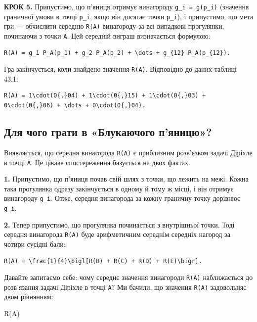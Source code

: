 \documentclass[
  ukrainian,
]{article}
\begin{document}
\textbf{КРОК 5.} Припустимо, що п'яниця отримує винагороду
\texttt{g\_i\ =\ g(p\_i)} (значення граничної умови в точці
\texttt{p\_i}, якщо він досягає точки \texttt{p\_i}), і припустимо, що
мета гри --- обчислити середню \texttt{R(A)} винагороду за всі випадкові
прогулянки, починаючи з точки \texttt{A}. Цей середній виграш
визначається формулою:

\begin{verbatim}
R(A) = g_1 P_A(p_1) + g_2 P_A(p_2) + \dots + g_{12} P_A(p_{12}).
\end{verbatim}

Гра закінчується, коли знайдено значення \texttt{R(A)}. Відповідно до
даних таблиці 43.1:

\begin{verbatim}
R(A) = 1\cdot(0{,}04) + 1\cdot(0{,}15) + 1\cdot(0{,}03) + 0\cdot(0{,}06) + \dots + 0\cdot(0{,}04).
\end{verbatim}

\subsection{Для чого грати в «Блукаючого
п'яницю»?}\label{ux434ux43bux44f-ux447ux43eux433ux43e-ux433ux440ux430ux442ux438-ux432-ux431ux43bux443ux43aux430ux44eux447ux43eux433ux43e-ux43fux44fux43dux438ux446ux44e}

Виявляється, що середня винагорода \texttt{R(A)} є приблизним розв'язком
задачі Діріхле в точці \texttt{A}. Це цікаве спостереження базується на
двох фактах.

\textbf{1.} Припустимо, що п'яниця почав свій шлях з точки, що лежить на
межі. Кожна така прогулянка одразу закінчується в одному й тому ж місці,
і він отримує винагороду \texttt{g\_i}. Отже, середня винагорода за
кожну граничну точку дорівнює \texttt{g\_i}.

\textbf{2.} Тепер припустимо, що прогулянка починається з внутрішньої
точки. Тоді середня винагорода \texttt{R(A)} буде арифметичним середнім
середніх нагород за чотири сусідні бали:

\begin{verbatim}
R(A) = \frac{1}{4}\bigl[R(B) + R(C) + R(D) + R(E)\bigr].
\end{verbatim}

Давайте запитаємо себе: чому середнє значення винагороди \texttt{R(A)}
наближається до розв'язання задачі Діріхле в точці \texttt{A}? Ми
бачили, що значення \texttt{R(A)} задовольняє двом рівнянням:

R(A)
\end{document}
